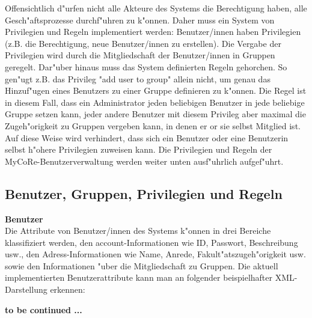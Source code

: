 Offensichtlich d"urfen nicht alle Akteure des Systems die Berechtigung haben, alle 
Gesch"aftsprozesse durchf"uhren zu k"onnen. 
Daher muss ein System von Privilegien und Regeln implementiert werden: Benutzer/innen 
haben Privilegien (z.B. die Berechtigung, neue Benutzer/innen zu erstellen). 
Die Vergabe der Privilegien wird durch die Mitgliedschaft der Benutzer/innen in Gruppen 
geregelt. 
Dar"uber hinaus muss das System definierten Regeln gehorchen. 
So gen"ugt z.B. das Privileg "add user to group" allein nicht, 
um genau das Hinzuf"ugen eines Benutzers zu einer Gruppe definieren zu k"onnen. 
Die Regel ist in diesem Fall, dass ein Administrator jeden beliebigen Benutzer in 
jede beliebige Gruppe setzen kann, jeder andere Benutzer mit diesem Privileg aber maximal 
die Zugeh"origkeit zu Gruppen vergeben kann, in denen er or sie selbst Mitglied ist. 
Auf diese Weise wird verhindert, dass sich ein Benutzer oder eine Benutzerin selbst 
h"ohere Privilegien zuweisen kann. 
Die Privilegien und Regeln der MyCoRe-Benutzerverwaltung werden weiter unten ausf"uhrlich 
aufgef"uhrt.

\subsection{Benutzer, Gruppen, Privilegien und Regeln}
{\bf Benutzer}\\
Die Attribute von Benutzer/innen des Systems k"onnen in drei Bereiche klassifiziert 
werden, den account-Informationen wie ID, Passwort, Beschreibung usw., 
den Adress-Informationen wie Name, Anrede, Fakult"atszugeh"origkeit usw. sowie 
den Informationen "uber die Mitgliedschaft zu Gruppen. 
Die aktuell implementierten Benutzerattribute kann man an folgender beispielhafter 
XML-Darstellung erkennen:

{\bf to be continued ...}
